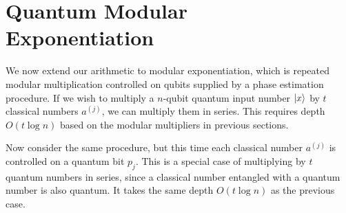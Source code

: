 \section{Quantum Modular\\ Exponentiation}
\label{sec:modexp}

We now extend our arithmetic to modular exponentiation, which is repeated
modular multiplication controlled on qubits supplied by a phase estimation
procedure.
If we wish to multiply a $n$-qubit quantum input number $\left\vert{x}\right\rangle$ by
$t$ classical numbers $a^{(j)}$, we can multiply them in series.
This requires depth $O(t\log n)$ based on the modular multipliers in previous
sections.


Now consider the same procedure, but this time each classical number $a^{(j)}$
is controlled on a quantum bit $p_j$. This is a special case of
multiplying by $t$ quantum numbers in series, since a classical number
entangled with a quantum number is also quantum.
It takes the same depth $O(t\log n)$ as the previous case.
%

